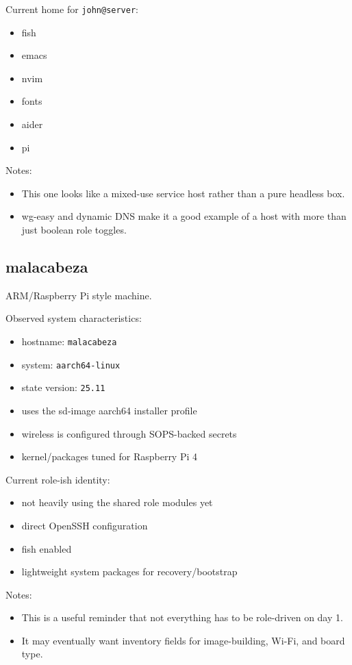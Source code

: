 \documentclass[11pt]{article}
\begin{document}
Current home for \texttt{john@server}:
\begin{itemize}
\item fish
\item emacs
\item nvim
\item fonts
\item aider
\item pi
\end{itemize}

Notes:
\begin{itemize}
\item This one looks like a mixed-use service host rather than a pure headless box.
\item wg-easy and dynamic DNS make it a good example of a host with more than just
boolean role toggles.
\end{itemize}
\subsection{malacabeza}
\label{sec:org3f3b810}
ARM/Raspberry Pi style machine.

Observed system characteristics:
\begin{itemize}
\item hostname: \texttt{malacabeza}
\item system: \texttt{aarch64-linux}
\item state version: \texttt{25.11}
\item uses the sd-image aarch64 installer profile
\item wireless is configured through SOPS-backed secrets
\item kernel/packages tuned for Raspberry Pi 4
\end{itemize}

Current role-ish identity:
\begin{itemize}
\item not heavily using the shared role modules yet
\item direct OpenSSH configuration
\item fish enabled
\item lightweight system packages for recovery/bootstrap
\end{itemize}

Notes:
\begin{itemize}
\item This is a useful reminder that not everything has to be role-driven on day 1.
\item It may eventually want inventory fields for image-building, Wi-Fi, and board
type.
\end{itemize}
\end{document}
